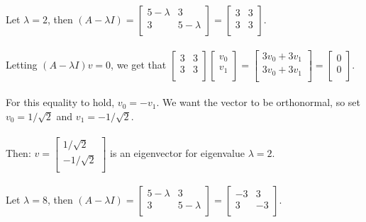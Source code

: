 \documentclass[11pt]{article}
\begin{document}
Let $\lambda = 2$, then $(A - \lambda I) = \begin{bmatrix}
5 - \lambda & 3 \\
3 & 5 - \lambda \\
\end{bmatrix} = \begin{bmatrix}
3 & 3 \\
3 & 3 \\
\end{bmatrix}$. \\\\
Letting $(A - \lambda I)v = 0$, we get that $ \begin{bmatrix}
3 & 3 \\
3 & 3 \\
\end{bmatrix} \begin{bmatrix}
v_0 \\
v_1 \\
\end{bmatrix} = \begin{bmatrix}
3v_0 + 3v_1 \\
3v_0 + 3v_1 \\
\end{bmatrix} = \begin{bmatrix}
0 \\
0 \\
\end{bmatrix} $. \\\\
For this equality to hold, $v_0 = -v_1$. We want the vector to be orthonormal, so set $v_0 = 1 / \sqrt2$ and $v_1 = - 1 / \sqrt2.$ \\\\
Then: $v = \begin{bmatrix}
1 / \sqrt2 \\
- 1 / \sqrt2 \\
\end{bmatrix}$ is an eigenvector for eigenvalue $\lambda = 2$. \\\\
Let $\lambda = 8$, then $(A - \lambda I) = \begin{bmatrix}
5 - \lambda & 3 \\
3 & 5 - \lambda \\
\end{bmatrix} = \begin{bmatrix}
-3 & 3 \\
3 & -3 \\
\end{bmatrix}$. \\\\
\end{document}
